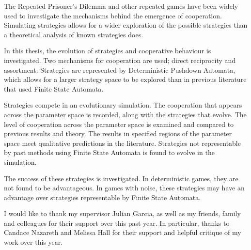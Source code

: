 \documentclass[a4paper,11pt,bcshonoursthesis,singlespace,oneside,thesisdraft,pdflatex]{cssethesis}
\begin{document}
\frontmatter					%

\thesistitlepage				%
\thesiscopyrightpage			%
\tableofcontents				%
\listoftables					%
\listoffigures					%

\begin{thesisabstract}			%
The Repeated Prisoner's Dilemma and other repeated games have been widely used to investigate the mechanisms behind the emergence of cooperation. 
Simulating strategies allows for a wider exploration of the possible strategies than a theoretical analysis of known strategies does. 


In this thesis, the evolution of strategies and cooperative behaviour is investigated. 
Two mechanisms for cooperation are used; direct reciprocity and assortment. 
Strategies are represented by Deterministic Pushdown Automata, which allows for a larger strategy space to be explored than in previous literature that used Finite State Automata. 

Strategies compete in an evolutionary simulation. 
The cooperation that appears across the parameter space is recorded, along with the strategies that evolve. 
The level of cooperation across the parameter space is examined and compared to previous results and theory. 
The results in specified regions of the parameter space meet qualitative predictions in the literature.
Strategies not representable by past methods using Finite State Automata is found to evolve in the simulation. 

The success of these strategies is investigated. In deterministic games, they are not found to be advantageous. In games with noise, these strategies may have an advantage over strategies representable by Finite State Automata. 
\end{thesisabstract}                 

\thesisdeclarationpage			%

\begin{thesisacknowledgments}	%
I would like to thank my supervisor Julian Garcia, as well as my friends, family and colleagues for their support over this past year. In particular, thanks to Candace Nazareth and Melissa Hall for their support and helpful critique of my work over this year.
\end{thesisacknowledgments}   
\end{document}
